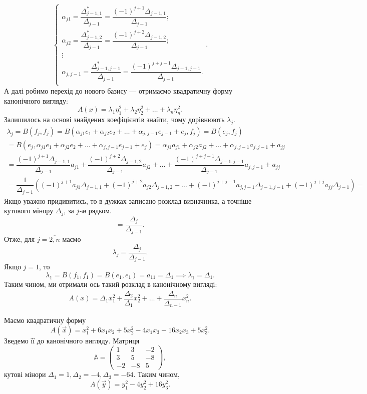 \documentclass{math_library}
\begin{document}
\[
\begin{cases}
\alpha_{j1} = \dfrac{\Delta_{j-1,1}^*}{\Delta_{j-1}} = \dfrac{(-1)^{j+1}\Delta_{j-1,1}}{\Delta_{j-1}}; \\
\alpha_{j2} = \dfrac{\Delta_{j-1,2}^*}{\Delta_{j-1}} = \dfrac{(-1)^{j+2} \Delta_{j-1,2}}{\Delta_{j-1}}; \\
\vdots \\
\alpha_{j,j-1} = \dfrac{\Delta_{j-1,j-1}^*}{\Delta_{j-1}} = \dfrac{(-1)^{j+j-1} \Delta_{j-1,j-1}}{\Delta_{j-1}}. \\
\end{cases}.
\]
А далі робимо перехід до нового базису --- отримаємо квадратичну форму канонічного вигляду:
\[
A(x) = \lambda_1 \eta_1^2 + \lambda_2 \eta_2^2 + \dots + \lambda_n \eta_n^2.
\]
Залишилось на основі знайдених коефіцієнтів знайти, чому дорівнюють $\lambda_j$.
\begin{align*}
\lambda_j = B(f_j,f_j) = B(\alpha_{j1}e_1 + \alpha_{j2}e_2 + \dots + \alpha_{j,j-1}e_{j-1}+e_j, f_j) = B(e_j,f_j) \\ 
= B(e_j, \alpha_{j1}e_1 + \alpha_{j2}e_2 + \dots + \alpha_{j,j-1}e_{j-1}+e_j) = \alpha_{j1}a_{j1} + \alpha_{j2}a_{j2} + \dots + \alpha_{j,j-1}a_{j,j-1} + a_{jj} \\
= \dfrac{(-1)^{j+1} \Delta_{j-1,1}}{\Delta_{j-1}}a_{j1} + \dfrac{(-1)^{j+2} \Delta_{j-1,2}}{\Delta_{j-1}}a_{j2} + \dots + \dfrac{(-1)^{j+j-1} \Delta_{j-1,j-1}}{\Delta_{j-1}}a_{j,j-1} + a_{jj} \\
= \dfrac{1}{\Delta_{j-1}} \left( (-1)^{j+1}a_{j1}\Delta_{j-1,1} + (-1)^{j+2}a_{j2}\Delta_{j-1,2} + \dots + (-1)^{j+j-1}a_{j,j-1}\Delta_{j-1,j-1} + (-1)^{j+j}a_{jj}\Delta_{j-1} \right) \boxed{=}
\end{align*}
Якщо уважно придивитись, то в дужках записано розклад визначника, а точніше кутового мінору $\Delta_j$, за $j$\textit{-м} рядком.
\[
\boxed{=} \dfrac{\Delta_j}{\Delta_{j-1}}.
\]
Отже, для $j= \overline{2,n}$ маємо 
\[
\lambda_j = \dfrac{\Delta_j}{\Delta_{j-1}}.
\]
Якщо $j=1$, то 
\[
\lambda_1 = B(f_1,f_1) = B(e_1,e_1) = a_{11} = \Delta_1 \implies \lambda_1 = \Delta_1.
\]
Таким чином, ми отримали ось такий розклад в канонічному вигляді:
\begin{align*}
A(x) = \Delta_1 x_1^2 + \dfrac{\Delta_2}{\Delta_1} x_2^2 + \dots + \dfrac{\Delta_n}{\Delta_{n-1}} x_n^2.
\end{align*}

\begin{example}
Маємо квадратичну форму 
\[
A(\vec{x}) = x_1^2 + 6x_1x_2 + 5x_2^2 - 4x_1x_3 - 16x_2x_3 + 5x_3^2.
\]
Зведемо її до канонічного вигляду. Матриця 
\[
\mathbb{A} = \begin{pmatrix}
1 & 3 & -2 \\
3 & 5 & -8 \\
-2 & -8 & 5
\end{pmatrix},
\]
кутові мінори $\Delta_1 = 1, \Delta_2 = -4, \Delta_3 = -64$. Таким чином, 
\[
A(\vec{y}) = y_1^2 - 4y_2^2 + 16y_3^2.
\]
\end{example}
\end{document}
